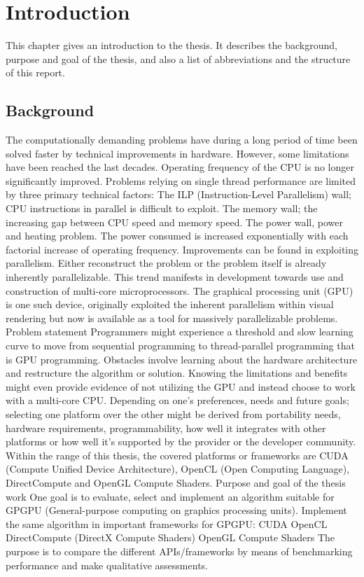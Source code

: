 \chapter{Introduction}\label{cha:intro}
This chapter gives an introduction to the thesis. It describes the background, purpose and goal of the thesis, and also a list of abbreviations and the structure of this report.
\section{Background}
The computationally demanding problems have during a long period of time been solved faster by technical improvements in hardware. However, some limitations have been reached the last decades. Operating frequency of the CPU is no longer significantly improved. Problems relying on single thread performance are limited by three primary technical factors:
The ILP (Instruction-Level Parallelism) wall; CPU instructions in parallel is difficult to exploit.
The memory wall; the increasing gap between CPU speed and memory speed.
The power wall, power and heating problem. The power consumed is increased exponentially with each factorial increase of operating frequency.
Improvements can be found in exploiting parallelism. Either reconstruct the problem or the problem itself is already inherently parallelizable. This trend manifests in development towards use and construction of multi-core microprocessors. The graphical processing unit (GPU) is one such device, originally exploited the inherent parallelism within visual rendering but now is available as a tool for massively parallelizable problems.
Problem statement
Programmers might experience a threshold and slow learning curve to move from sequential programming to thread-parallel programming that is GPU programming. Obstacles involve learning about the hardware architecture and restructure the algorithm or solution. Knowing the limitations and benefits might even provide evidence of not utilizing the GPU and instead choose to work with a multi-core CPU.
Depending on one's preferences, needs and future goals; selecting one platform over the other might be derived from portability needs, hardware requirements, programmability, how well it integrates with other platforms or how well it's supported by the provider or the developer community. Within the range of this thesis, the covered platforms or frameworks are CUDA (Compute Unified Device Architecture), OpenCL (Open Computing Language), DirectCompute and OpenGL Compute Shaders.
Purpose and goal of the thesis work
One goal is to evaluate, select and implement an algorithm suitable for GPGPU (General-purpose computing on graphics processing units).
Implement the same algorithm in important frameworks for GPGPU:
CUDA
OpenCL
DirectCompute (DirectX Compute Shaders)
OpenGL Compute Shaders
The purpose is to compare the different APIs/frameworks by means of benchmarking performance and make qualitative assessments.
